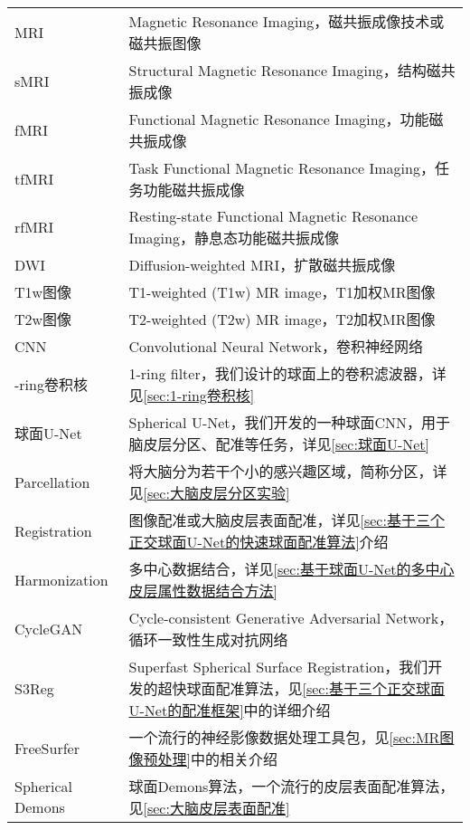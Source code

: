 \cleardoublepage
{}

\begin{center}
    \begin{longtable}{>{\raggedleft}p{}  p{}}
            MRI   & Magnetic Resonance Imaging，磁共振成像技术或磁共振图像\\
            sMRI & Structural Magnetic Resonance Imaging，结构磁共振成像 \\
            fMRI & Functional Magnetic Resonance Imaging，功能磁共振成像 \\
            tfMRI & Task Functional Magnetic Resonance Imaging，任务功能磁共振成像 \\
            rfMRI & Resting-state Functional Magnetic Resonance Imaging，静息态功能磁共振成像 \\
            DWI  & Diffusion-weighted MRI，扩散磁共振成像 \\
            T1w图像  & T1-weighted (T1w) MR image，T1加权MR图像 \\
            T2w图像  & T2-weighted (T2w) MR image，T2加权MR图像  \\
            CNN     & Convolutional Neural Network，卷积神经网络 \\
            1-ring卷积核 & 1-ring filter，我们设计的球面上的卷积滤波器，详见\ref{sec:1-ring卷积核} \\
            球面U-Net & Spherical U-Net，我们开发的一种球面CNN，用于脑皮层分区、配准等任务，详见\ref{sec:球面U-Net} \\
            Parcellation & 将大脑分为若干个小的感兴趣区域，简称分区，详见\ref{sec:大脑皮层分区实验} \\
            Registration & 图像配准或大脑皮层表面配准，详见\ref{sec:基于三个正交球面U-Net的快速球面配准算法}介绍 \\
            Harmonization & 多中心数据结合，详见\ref{sec:基于球面U-Net的多中心皮层属性数据结合方法} \\
            CycleGAN & Cycle-consistent Generative Adversarial Network，循环一致性生成对抗网络 \\
            S3Reg & Superfast Spherical Surface Registration，我们开发的超快球面配准算法，见\ref{sec:基于三个正交球面U-Net的配准框架}中的详细介绍 \\
            FreeSurfer & 一个流行的神经影像数据处理工具包，见\ref{sec:MR图像预处理}中的相关介绍 \\
            Spherical Demons & 球面Demons算法，一个流行的皮层表面配准算法，见\ref{sec:大脑皮层表面配准}\\

\end{longtable}
\end{center}
